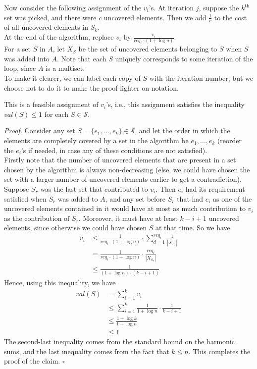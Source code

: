 \documentclass[a4paper]{article}
\newenvironment{proof}{\begin{breakbox}\textit{Proof.}}{\hfill$\square$\end{breakbox}}
\newcommand{\nl}{\vspace{0.2cm}\\}
\begin{document}
Now consider the following assignment of the $v_i$'s. At iteration $j$, suppose the $k^\mathrm{th}$ set was picked, and there were $c$ uncovered elements. Then we add $\frac{1}{c}$ to the
cost of all uncovered elements in $S_k$.\nl
At the end of the algorithm, replace $v_i$ by $\frac{v_i}{req_i \cdot (1 + \log n)}$.\nl
    For a set $S$ in $A$, let $X_S$ be the set of uncovered elements belonging to $S$ when $S$ was added into $A$. Note that each $S$ uniquely corresponds to some iteration of the loop, since $A$
    is a multiset.\nl
    To make it clearer, we can label each copy of $S$ with the iteration number, but we choose not to do it to make the proof lighter on notation.\nl
\begin{claim}
    This is a feasible assignment of $v_i$'s, i.e., this assignment satisfies the inequality $val(S) \le 1$ for each $S \in \mathcal{S}$.
\end{claim}
\begin{proof}
    Consider any set $S = \{e_1, \ldots, e_k\} \in \mathcal{S}$, and let the order in which the elements are completely covered by a set in the algorithm be $e_1, \ldots, e_k$ (reorder the $e_i$'s
    if needed, in case any of these conditions are not satisfied).\nl
    Firstly note that the number of uncovered elements that are present in a set chosen by the algorithm is always non-decreasing (else, we could have chosen the set with a larger number of
    uncovered elements earlier to get a contradiction). Suppose $S_r$ was the last set that contributed to $v_i$. Then $e_i$ had its requirement satisfied when $S_r$ was added to $A$, and any
    set before $S_r$ that had $e_i$ as one of the uncovered elements contained in it would have at most as much contribution to $v_i$ as the contribution of $S_r$. Moreover, it must have at least
    $k - i + 1$ uncovered elements, since otherwise we could have chosen $S$ at that time. So we have\nl
    \begin{align*}
        v_i &\le \frac{1}{req_i \cdot (1 + \log n)} \cdot \sum_{d = 1}^{req_i} \frac{1}{|X_{S_r}|}\\
            &= \frac{1}{req_i \cdot (1 + \log n)} \cdot \frac{req_i}{|X_{S_r}|}\\
            &\le \frac{1}{(1 + \log n) \cdot (k - i + 1)}
    \end{align*}
    Hence, using this inequality, we have
    \begin{align*}
        val(S) &= \sum_{i = 1}^k v_i\\
               &\le \sum_{i = 1}^k \frac{1}{1 + \log n} \cdot \frac{1}{k - i + 1}\\
               &\le \frac{1 + \log k}{1 + \log n}\\
               &\le 1
    \end{align*}
    The second-last inequality comes from the standard bound on the harmonic sums, and the last inequality comes from the fact that $k \le n$.
    This completes the proof of the claim.
\end{proof}
\end{document}
